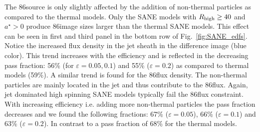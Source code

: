 The 86\GHz source is only slightly affected by the addition of non-thermal particles as compared to the thermal models. Only the SANE models with $R_{\rm high}\geq 40$ and $a^{\star}>0$ produce 86\GHz image sizes larger than the thermal SANE models. This effect can be seen in  first and third panel in the bottom row of Fig.~\ref{fig:SANE_edfs}. Notice the increased flux density in the jet sheath in the difference image (blue color). This trend increases with the efficiency and is reflected in the decreasing pass fraction: 56\% (for $\varepsilon=0.05,0.1$) and 55\% ($\varepsilon=0.2$) as compared to thermal models (59\%).  
A similar trend is found for the 86\GHz flux density. The non-thermal particles are mainly located in the jet and thus contribute to the 86\GHz flux. Again, jet dominated high spinning SANE models typically fail the 86\GHz flux constraint. With increasing efficiency i.e. adding more non-thermal particles the pass fraction decreases and we found the following fractions: 67\% ($\varepsilon=0.05$), 66\% ($\varepsilon=0.1$) and 63\% ($\varepsilon=0.2$). In contrast to a pass fraction of 68\% for the thermal models.






